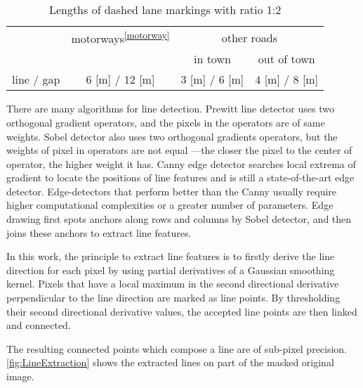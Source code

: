 \setlength{\floatsep}{16pt plus 1.0pt minus 2.0pt}
\begin{table} [h!]
	\centering
	\begin{tabular}{l|ccc}
		\toprule
		& motorways\textsuperscript{\ref{motorway}} & \multicolumn{2}{c}{other roads}\\
		\cline{3-4}
		&           & in town & out of town\\
		\midrule
		line / gap  & $6$ [m] / $12$ [m] & $3$ [m] / $6$ [m] & $4$ [m] / $8$ [m]\\
		\bottomrule
	\end{tabular}
	\caption{\small Lengths of dashed lane markings with ratio 1:2 \cite{RMS1}}
	\label{tab:DashedLaneMarkingLengths}
\end{table}


\clearpage

There are many algorithms for line detection. Prewitt line detector uses two orthogonal gradient operators, and the pixels in the operators are of same weights. Sobel detector also uses two orthogonal gradients operators, but the weights of pixel in operators are not equal ---the closer the pixel to the center of operator, the higher weight it has. Canny edge detector searches local extrema of gradient to locate the positions of line features and is still a state-of-the-art edge detector. Edge-detectors that perform better than the Canny usually require higher computational complexities or a greater number of parameters. Edge drawing \cite{Topal2012} first spots anchors along rows and columns by Sobel detector, and then joins these anchors to extract line features.

In this work, the principle to extract line features is to firstly derive the line direction for each pixel by using partial derivatives of a Gaussian smoothing kernel. Pixels that have a local maximum in the second directional derivative perpendicular to the line direction are marked as line points. By thresholding their second directional derivative values, the accepted line points are then linked and connected.\cite{Steger1998}

The resulting connected points which compose a line are of sub-pixel precision. \cref{fig:LineExtraction} shows the extracted lines on part of the masked original image.

